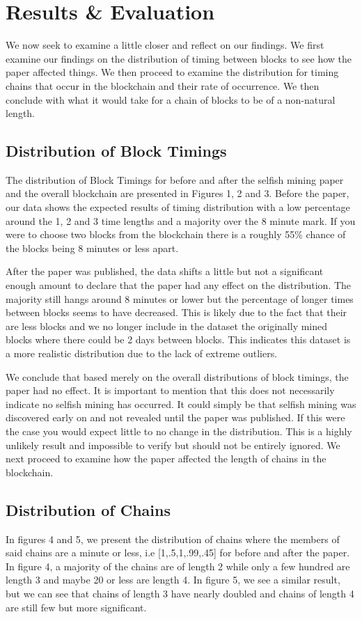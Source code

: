 \documentclass{sig-alternate-05-2015}
\begin{document}
\section{Results \& Evaluation}
We now seek to examine a little closer and reflect on our findings. We first examine our findings on the distribution of timing between blocks to see how the paper affected things. We then proceed to examine the distribution for timing chains that occur in the blockchain and their rate of occurrence. We then conclude with what it would take for a chain of blocks to be of a non-natural length.  


\subsection{Distribution of Block Timings}
The distribution of Block Timings for before and after the selfish mining paper and the overall blockchain are presented in Figures 1, 2 and 3. Before the paper, our data shows the expected results of timing distribution with a low percentage around the 1, 2 and 3 time lengths and a majority over the 8 minute mark. If you were to choose two blocks from the blockchain there is a roughly 55\% chance of the blocks being 8 minutes or less apart. 

After the paper was published, the data shifts a little but not a significant enough amount to declare that the paper had any effect on the distribution. The majority still hangs around 8 minutes or lower but the percentage of longer times between blocks seems to have decreased. This is likely due to the fact that their are less blocks and we no longer include in the dataset the originally mined blocks where there could be 2 days between blocks. This indicates this dataset is a more realistic distribution due to the lack of extreme outliers.

We conclude that based merely on the overall distributions of block timings, the paper had no effect. It is important to mention that this does not necessarily indicate no selfish mining has occurred. It could simply be that selfish mining was discovered early on and not revealed until the paper was published. If this were the case you would expect little to no change in the distribution. This is a highly unlikely result and impossible to verify but should not be entirely ignored. We next proceed to examine how the paper affected the length of chains in the blockchain. 

\subsection{Distribution of Chains}
In figures 4 and 5, we present the distribution of chains where the members of said chains are a minute or less, i.e [1,.5,1,.99,.45] for before and after the paper. In figure 4, a majority of the chains are of length 2 while only a few hundred are length 3 and maybe 20 or less are length 4. In figure 5, we see a similar result, but we can see that chains of length 3 have nearly doubled and chains of length 4 are still few but more significant. 
\end{document}
